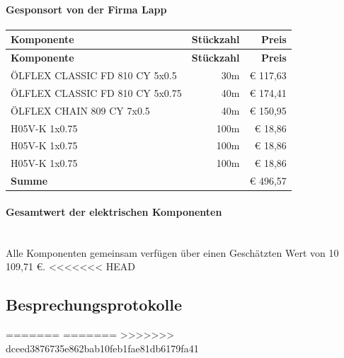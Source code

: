 \paragraph{Gesponsort von der Firma Lapp}
\begin{longtable}{|p{7cm}|r|r|}
    \hline
    \textbf{Komponente} & \textbf{Stückzahl} & \textbf{Preis} \\
    \hline
    \endfirsthead

    \hline
    \textbf{Komponente} & \textbf{Stückzahl} & \textbf{Preis} \\
    \hline
    \endhead

    \hline
    \endfoot

    \hline
    \endlastfoot
    \hline
    \hline
    ÖLFLEX CLASSIC FD 810 CY 5x0.5 & 30m & € 117,63 \\
    ÖLFLEX CLASSIC FD 810 CY 5x0.75 & 40m & € 174,41 \\
    ÖLFLEX CHAIN 809 CY 7x0.5 & 40m & € 150,95 \\
    H05V-K 1x0.75 & 100m & € 18,86 \\
    H05V-K 1x0.75 & 100m & € 18,86 \\
    H05V-K 1x0.75 & 100m & € 18,86 \\
    \textbf{Summe} & & € 496,57\\
\end{longtable}

\paragraph{Gesamtwert der elektrischen Komponenten}\mbox{}\\
    Alle Komponenten gemeinsam verfügen über einen Geschätzten Wert von 10 109,71 €.
\newpage
<<<<<<< HEAD
\subsection{Besprechungsprotokolle}
=======
=======
>>>>>>> dceed3876735e862bab10feb1fae81db6179fa41
